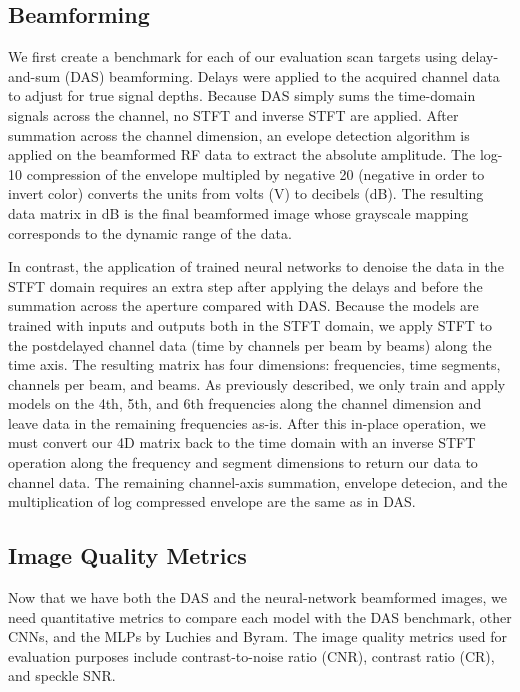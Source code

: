 \subsection{Beamforming}

We first create a benchmark for each of our evaluation scan targets using delay-and-sum (DAS) beamforming. Delays were applied to the acquired channel data to adjust for true signal depths. Because DAS simply sums the time-domain signals across the channel, no STFT and inverse STFT are applied. After summation across the channel dimension, an evelope detection algorithm is applied on the beamformed RF data to extract the absolute amplitude. The log-10 compression of the envelope multipled by negative 20 (negative in order to invert color) converts the units from volts (V) to decibels (dB). The resulting data matrix in dB is the final beamformed image whose grayscale mapping corresponds to the dynamic range of the data.

In contrast, the application of trained neural networks to denoise the data in the STFT domain requires an extra step after applying the delays and before the summation across the aperture compared with DAS. Because the models are trained with inputs and outputs both in the STFT domain, we apply STFT to the postdelayed channel data (time by channels per beam by beams) along the time axis. The resulting matrix has four dimensions: frequencies, time segments, channels per beam, and beams. As previously described, we only train and apply models on the 4th, 5th, and 6th frequencies along the channel dimension and leave data in the remaining frequencies as-is. After this in-place operation, we must convert our 4D matrix back to the time domain with an inverse STFT operation along the frequency and segment dimensions to return our data to channel data. The remaining channel-axis summation, envelope detecion, and the multiplication of log compressed envelope are the same as in DAS.


\subsection{Image Quality Metrics}

Now that we have both the DAS and the neural-network beamformed images, we need quantitative metrics to compare each model with the DAS benchmark, other CNNs, and the MLPs by Luchies and Byram. The image quality metrics used for evaluation purposes include contrast-to-noise ratio (CNR), contrast ratio (CR), and speckle SNR.

